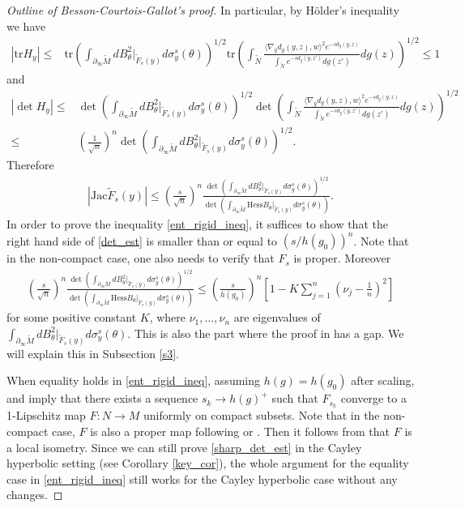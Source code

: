 \documentclass{article}
\newcommand{\del}{\partial}
\newcommand{\hess}{\mathrm{Hess}}
\newcommand{\tr}{\mathrm{tr}}
\theoremstyle{definition}
\begin{document}
\begin{proof}[Outline of Besson-Courtois-Gallot's proof]
In particular, by H\"older's inequality we have 
\begin{align}\label{trace_control}
|\tr H_y|\leq&\tr\left(\int_{\del_\infty\widetilde M}dB^2_\theta|_{\widetilde F_s(y)}d\sigma_y^s(\theta)\right)^{1/2}\tr\left(\int_{\widetilde N}\frac{\langle \nabla_yd_g(y,z),w\rangle^2e^{-sd_g(y,z)}}{\int_{\widetilde N}e^{-sd_g(y,z')}dg(z')} dg(z)\right)^{1/2}\leq 1
\end{align}
and
\begin{align}\label{Holder}
|\det H_y|\leq&\det\left(\int_{\del_\infty\widetilde M}dB^2_\theta|_{\widetilde F_s(y)}d\sigma_y^s(\theta)\right)^{1/2}\det\left(\int_{\widetilde N}\frac{\langle \nabla_yd_g(y,z),w\rangle^2e^{-sd_g(y,z)}}{\int_{\widetilde N}e^{-sd_g(y,z')}dg(z')} dg(z)\right)^{1/2}\nonumber\\
\leq&\left(\frac{1}{\sqrt{n}}\right)^n\det\left(\int_{\del_\infty\widetilde M}dB^2_\theta|_{\widetilde F_s(y)}d\sigma_y^s(\theta)\right)^{1/2}.
\end{align}
Therefore
\begin{align}\label{det_est}
|\mathrm{Jac} \widetilde F_s(y)|\leq \left(\frac{s}{\sqrt{n}}\right)^n\frac{\det\left(\int_{\del_\infty\widetilde M}dB^2_\theta|_{\widetilde F_s(y)}d\sigma_y^s(\theta)\right)^{1/2}}{\det\left(\int_{\del_\infty\widetilde M}\hess B_\theta|_{\widetilde F_s(y)}d\sigma_y^s(\theta)\right)}.
\end{align}
In order to prove the inequality \eqref{ent_rigid_ineq}, it suffices to show that the right hand side of \eqref{det_est} is smaller than or equal to $(s/h(g_0))^n$. Note that in the non-compact case, one also needs to verify that $F_s$ is proper. Moreover
\begin{align}\label{sharp_det_est}
\left(\frac{s}{\sqrt{n}}\right)^n\frac{\det\left(\int_{\del_\infty\widetilde M}dB^2_\theta|_{\widetilde F_s(y)}d\sigma_y^s(\theta)\right)^{1/2}}{\det\left(\int_{\del_\infty\widetilde M}\hess B_\theta|_{\widetilde F_s(y)}d\sigma_y^s(\theta)\right)}\leq\left(\frac{s}{h(g_0)}\right)^n\left[1-K\sum_{j=1}^n\left(\nu_j-\frac{1}{n}\right)^2\right]
\end{align}
for some positive constant $K$, where $\nu_1,...,\nu_n$ are eigenvalues of $\int_{\del_\infty\widetilde M}dB^2_\theta|_{\widetilde F_s(y)}d\sigma_y^s(\theta)$. This is also the part where the proof in \cite{BCG1} has a gap. We will explain this in Subsection \ref{s3}. 

When equality holds in \eqref{ent_rigid_ineq}, assuming $h(g)=h(g_0)$ after scaling, \cite[7.6 Lemme]{BCG1} and \cite[7.8 Lemme]{BCG1} imply that there exists a sequence $s_k\to h(g)^+$ such that $F_{s_k}$ converge to a 1-Lipschitz map $F:N\to M$ uniformly on compact subsets. Note that in the non-compact case, $F$ is also a proper map following \cite[Proposition 5.1]{BCS} or \cite[Lemma 6.7]{CF0}. Then it follows from \cite[C.1 Proposition]{BCG1} that $F$ is a local isometry. Since we can still prove \eqref{sharp_det_est} in the Cayley hyperbolic setting (see Corollary \ref{key_cor}), the whole argument for the equality case in \eqref{ent_rigid_ineq} still works for the Cayley hyperbolic case without any changes. 


\end{proof}
\end{document}
